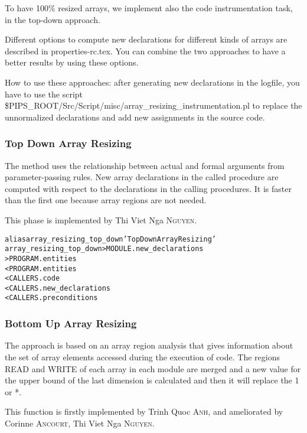 \documentclass[a4paper]{report}
\newenvironment{PipsMake}{\begin{alltt}}{\end{alltt}}
\begin{document}
To have 100\% resized arrays, we implement also the code instrumentation
task, in the top-down approach.

Different options to compute new declarations for different kinds of
arrays are described in properties-rc.tex. You can combine the two
approaches to have a better results by using these options.

How to use these approaches: after generating new declarations in the
logfile, you have to use the script
\$PIPS\_ROOT/Src/Script/misc/array\_resizing\_instrumentation.pl to replace the unnormalized
declarations and add new assignments in the source code.

\subsubsection{ Top Down Array Resizing}

The  method uses the relationship between actual and formal arguments from parameter-passing
rules. New array declarations in the called procedure are
computed with respect to the declarations in the calling procedures.
It is  faster than the first one because array regions are not needed.

This phase is implemented by Thi Viet Nga \textsc{Nguyen}.

\begin{PipsMake}
alias array_resizing_top_down 'Top Down Array Resizing'
array_resizing_top_down         > MODULE.new_declarations
                                > PROGRAM.entities
        < PROGRAM.entities
        < CALLERS.code
        < CALLERS.new_declarations
        < CALLERS.preconditions
\end{PipsMake}

\subsubsection{Bottom Up Array Resizing}


The approach is based on an array region analysis that gives
  information about the set of array elements accessed during the
  execution of code. The regions READ and WRITE of each
array in each module are merged and a new value for the upper bound of the last
dimension is calculated and then it will replace the 1 or *.

This function is firstly implemented by Trinh Quoc \textsc{Anh}, and
ameliorated by Corinne \textsc{Ancourt}, Thi Viet Nga \textsc{Nguyen}.
\end{document}
